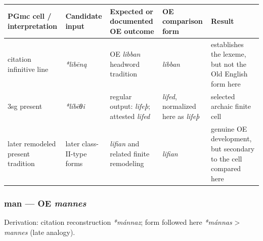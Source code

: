 \documentclass[
  british,
  a4paper,
]{article}
\newcounter{none} %
\begin{document}
{\def\LTcaptype{none} %
\begin{longtable}[]{@{}
  >{\raggedright\arraybackslash}p{}
  >{\raggedright\arraybackslash}p{}
  >{\raggedright\arraybackslash}p{}
  >{\raggedright\arraybackslash}p{}
  >{\raggedright\arraybackslash}p{}@{}}
\toprule\noalign{}
\begin{minipage}[b]{\linewidth}\raggedright
PGmc cell / interpretation
\end{minipage} & \begin{minipage}[b]{\linewidth}\raggedright
Candidate input
\end{minipage} & \begin{minipage}[b]{\linewidth}\raggedright
Expected or documented OE outcome
\end{minipage} & \begin{minipage}[b]{\linewidth}\raggedright
OE comparison form
\end{minipage} & \begin{minipage}[b]{\linewidth}\raggedright
Result
\end{minipage} \\
\midrule\noalign{}
\endhead
\bottomrule\noalign{}
\endlastfoot
citation infinitive line & {\emph{*libēną}} & OE {\emph{libban}}
headword tradition & {\emph{libban}} & establishes the lexeme, but not
the Old English form here \\
3sg present & {\emph{*líbēθi}} & regular output: {\emph{lifeþ}};
attested {\emph{lifed}} & {\emph{lifed}}, normalized here as
{\emph{lifeþ}} & selected archaic finite cell \\
later remodeled present tradition & later class-II-type forms &
{\emph{lifian}} and related finite remodeling & {\emph{lifian}} &
genuine OE development, but secondary to the cell compared here \\
\end{longtable}
}

\subsubsection{\texorpdfstring{man --- OE
\emph{mannes}}{man --- OE mannes}}\label{man-oe-mannes}

Derivation: citation reconstruction \emph{*mánnaz}; form followed here
\emph{*mánnas} \textgreater{} \emph{mannes} (late analogy).
\end{document}
